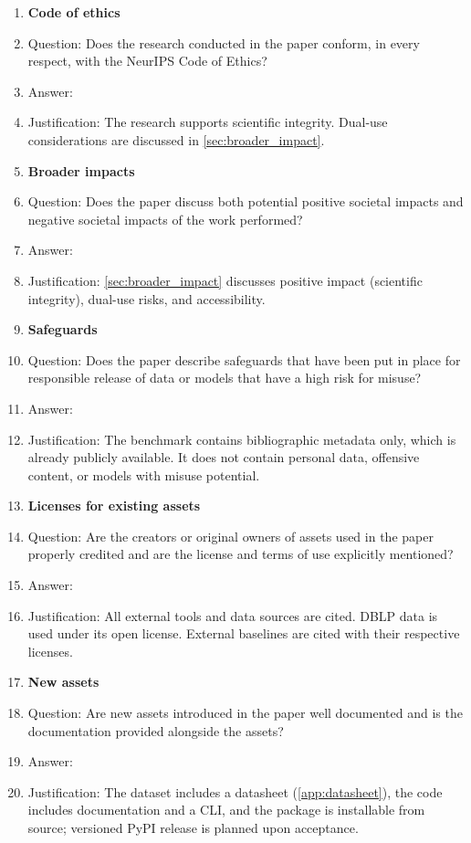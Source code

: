 \begin{enumerate}
\item {\bf Code of ethics}
    \item[] Question: Does the research conducted in the paper conform, in every respect, with the NeurIPS Code of Ethics?
    \item[] Answer: \answerYes{}
    \item[] Justification: The research supports scientific integrity. Dual-use considerations are discussed in \cref{sec:broader_impact}.

\item {\bf Broader impacts}
    \item[] Question: Does the paper discuss both potential positive societal impacts and negative societal impacts of the work performed?
    \item[] Answer: \answerYes{}
    \item[] Justification: \cref{sec:broader_impact} discusses positive impact (scientific integrity), dual-use risks, and accessibility.

\item {\bf Safeguards}
    \item[] Question: Does the paper describe safeguards that have been put in place for responsible release of data or models that have a high risk for misuse?
    \item[] Answer: \answerNA{}
    \item[] Justification: The benchmark contains bibliographic metadata only, which is already publicly available. It does not contain personal data, offensive content, or models with misuse potential.

\item {\bf Licenses for existing assets}
    \item[] Question: Are the creators or original owners of assets used in the paper properly credited and are the license and terms of use explicitly mentioned?
    \item[] Answer: \answerYes{}
    \item[] Justification: All external tools and data sources are cited. DBLP data is used under its open license. External baselines are cited with their respective licenses.

\item {\bf New assets}
    \item[] Question: Are new assets introduced in the paper well documented and is the documentation provided alongside the assets?
    \item[] Answer: \answerYes{}
    \item[] Justification: The dataset includes a datasheet (\cref{app:datasheet}), the code includes documentation and a CLI, and the package is installable from source; versioned PyPI release is planned upon acceptance.


\end{enumerate}
